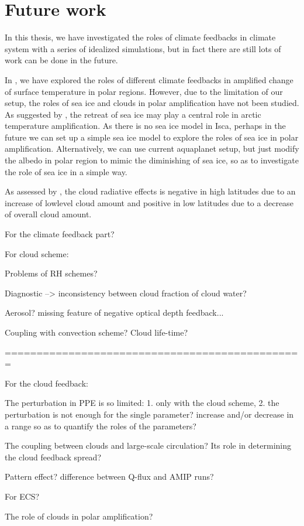 \section{Future work}
In this thesis, we have investigated the 
roles of climate feedbacks in climate system with a series of idealized simulations, but in fact there are still lots of work can be done in the future.

In , we have explored the roles of different climate feedbacks in amplified change of surface temperature in polar regions. However, due to the limitation of our setup, the roles of sea ice and clouds in polar amplification have not been studied. As suggested by \cite{Screen2010}, the retreat of sea ice may play a central role in arctic temperature amplification. As there is no sea ice model in Isca, perhaps in the future we can set up a simple sea ice model to explore the roles of sea ice in polar amplification. Alternatively, we can use current aquaplanet setup, but just modify the albedo in polar region to mimic the diminishing of sea ice, so as to investigate the role of sea ice in a simple way.

As assessed by \cite{Kim2018}, the cloud radiative effects is negative in high latitudes due to an increase of low­level cloud amount and positive in low latitudes due to a decrease of overall cloud amount.


For the climate feedback part?

For cloud scheme:

Problems of RH schemes?

Diagnostic --> inconsistency between cloud fraction of cloud water?

Aerosol? missing feature of negative optical depth feedback...

Coupling with convection scheme? Cloud life-time?

===============================================

For the cloud feedback:

The perturbation in PPE is so limited: 1. only with the cloud scheme, 2. the perturbation is not enough for the single parameter? increase and/or decrease in a range so as to quantify the roles of the parameters? 

The coupling between clouds and large-scale circulation? Its role in determining the cloud feedback spread?

Pattern effect? difference between Q-flux and AMIP runs?

For ECS?

The role of clouds in polar amplification?


